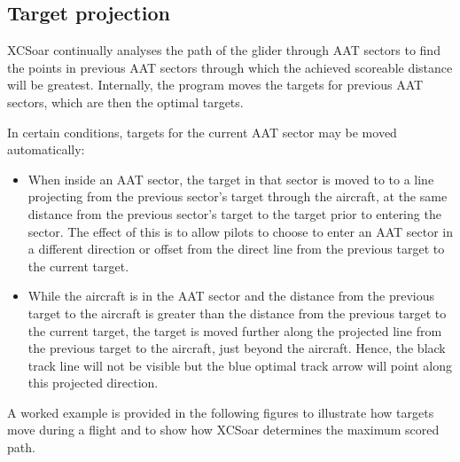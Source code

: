 \subsection*{Target projection}

XCSoar continually analyses the path of the glider through AAT sectors
to find the points in previous AAT sectors through which the achieved
scoreable distance will be greatest.  Internally, the program moves
the targets for previous AAT sectors, which are then the optimal
targets.

In certain conditions, targets for the current AAT sector may be moved
automatically:
\begin{itemize}
\item When inside an AAT sector, the target in that sector is moved to
to a line projecting from the previous sector's target through the
aircraft, at the same distance from the previous sector's target to
the target prior to entering the sector.  The effect of this is to
allow pilots to choose to enter an AAT sector in a different direction
or offset from the direct line from the previous target to the current
target.

\item While the aircraft is in the AAT sector and the distance from the
previous target to the aircraft is greater than the distance from the
previous target to the current target, the target is moved further
along the projected line from the previous target to the aircraft,
just beyond the aircraft.  Hence, the black track line will not be
visible but the blue optimal track arrow will point along this
projected direction.
\end{itemize}

A worked example is provided in the following figures to illustrate
how targets move during a flight and to show how XCSoar determines the
maximum scored path.

